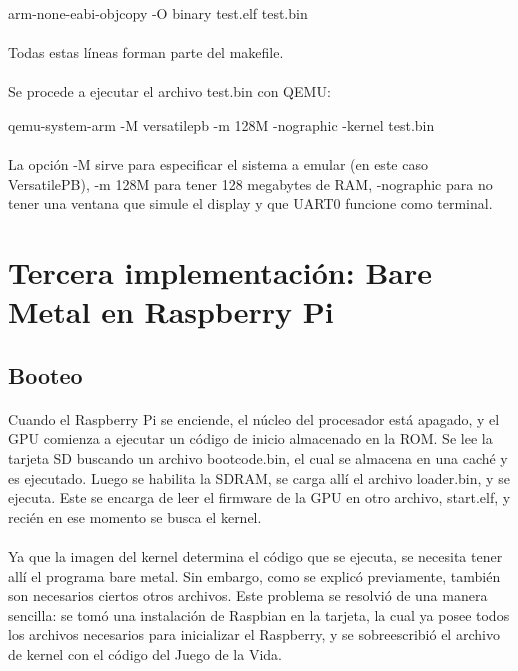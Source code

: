 \documentclass{article}
\begin{document}
\begin{commandshell}
arm-none-eabi-objcopy -O binary test.elf    test.bin
\end{commandshell}

\paragraph{}
Todas estas l\'ineas forman parte del makefile.

\paragraph{}
Se procede a ejecutar el archivo test.bin con QEMU:

\begin{commandshell}
qemu-system-arm -M versatilepb -m 128M         -nographic -kernel test.bin
\end{commandshell}

\paragraph{}
La opci\'on -M sirve para especificar el sistema a emular (en este caso VersatilePB), -m 128M para tener 128 megabytes de RAM, -nographic para no tener una ventana que simule el display y que UART0 funcione como terminal.


\section{Tercera implementaci\'on: Bare Metal en Raspberry Pi}

\subsection{Booteo}

\paragraph{}
Cuando el Raspberry Pi se enciende, el n\'ucleo del procesador est\'a apagado, y el GPU comienza a ejecutar un c\'odigo de inicio almacenado en la ROM. Se lee la tarjeta SD buscando un archivo bootcode.bin, el cual se almacena en una cach\'e y es ejecutado. Luego se habilita la SDRAM, se carga all\'i el archivo loader.bin, y se ejecuta. Este se encarga de leer el firmware de la GPU en otro archivo, start.elf, y reci\'en en ese momento se busca el kernel.

\paragraph{}
Ya que la imagen del kernel determina el c\'odigo que se ejecuta, se necesita tener all\'i el programa bare metal. Sin embargo, como se explic\'o previamente, tambi\'en son necesarios ciertos otros archivos. Este problema se resolvi\'o de una manera sencilla: se tom\'o una instalaci\'on de Raspbian en la tarjeta, la cual ya posee todos los archivos necesarios para inicializar el Raspberry, y se sobreescribi\'o el archivo de kernel con el c\'odigo del Juego de la Vida. 
\end{document}
